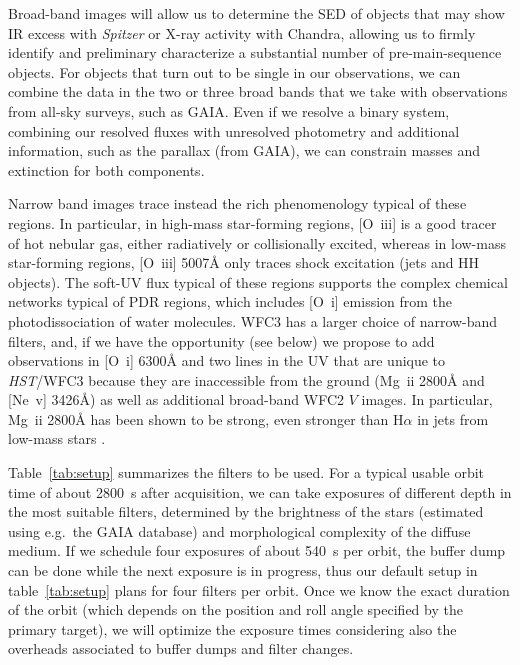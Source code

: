 \documentclass[12pt]{article}
\begin{document}
Broad-band images will allow us to determine the SED of objects that may show IR excess with \emph{Spitzer} or X-ray activity with Chandra, allowing us to firmly identify and preliminary characterize a substantial number of pre-main-sequence objects. For objects that turn out to be single in our observations, we can combine the data in the two or three broad bands that we take with observations from all-sky surveys, such as GAIA. Even if we resolve a binary system, combining our resolved fluxes with unresolved photometry and additional information, such as the parallax (from GAIA), we can constrain masses and extinction for both components.

Narrow band images trace instead the rich phenomenology typical of these regions. In particular, in 
high-mass star-forming regions, [O~{\sc iii}] is a good tracer of hot nebular gas, either radiatively or collisionally excited, whereas in low-mass star-forming regions, [O~{\sc iii}] 5007\AA{} only traces shock excitation (jets and HH objects). The soft-UV flux typical of these regions supports the complex chemical networks typical of PDR regions, which includes [O~{\sc i}] emission from the photodissociation of water molecules. WFC3 has a larger choice of narrow-band filters, and, if we have the opportunity (see below) we propose to add observations in [O~{\sc i}] 6300\AA{} and two lines in the UV that are unique to \emph{HST}/WFC3 because they are inaccessible from the ground (Mg~{\sc ii} 2800\AA{} and [Ne~{\sc v}] 3426\AA{}) as well as additional broad-band WFC2 $V$ images. In particular, Mg~{\sc ii} 2800\AA{} has been shown to be strong, even stronger than H$\alpha$ in jets from low-mass stars \citep{2007ApJ...663..350C}.

 Table~\ref{tab:setup} summarizes the filters to be used.
For a typical usable orbit time of about 2800~s after acquisition, we can take exposures of different depth in the most suitable filters, determined by the brightness of the stars (estimated using e.g.\ the GAIA database) and morphological complexity of the diffuse medium. If we schedule four exposures of about 540~s per orbit, the buffer dump can be done while the next exposure is in progress, thus our default setup in table~\ref{tab:setup} plans for four filters per orbit. 
Once we know the exact duration of the orbit (which depends on the position and roll angle specified by the primary target), we will optimize the exposure times considering also the overheads associated to buffer dumps and filter changes.
\end{document}
